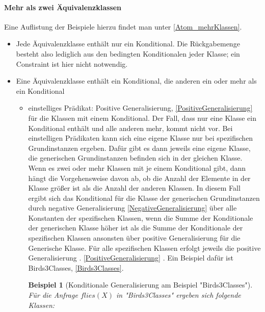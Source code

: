 \documentclass[a4paper, 11pt]{book}
\newtheorem{Bsp}{Beispiel}[section]
\begin{document}
\paragraph{ Mehr als zwei Äquivalenzklassen} 
Eine Auflistung der Beispiele hierzu findet man unter \ref{Atom_mehrKlassen}.\\
\begin{itemize}
	\item Jede Äquivalenzklasse enthält nur ein Konditional. Die Rückgabemenge besteht also lediglich aus den bedingten Konditionalen jeder Klasse; ein Constraint ist hier nicht notwendig.
	\item Eine Äquivalenzklasse enthält ein Konditional, die anderen ein oder mehr als ein Konditional
	\begin{itemize}
		\item einstelliges Prädikat: Positive Generalisierung, \ref{PositiveGeneralisierung} für die Klassen mit einem Konditional. Der Fall, dass nur eine Klasse ein Konditional enthält und alle anderen mehr, kommt nicht vor. Bei einstelligen Prädikaten kann sich eine eigene Klasse nur bei spezifischen Grundinstanzen ergeben. Dafür gibt es dann jeweils eine eigene Klasse, die generischen Grundinstanzen befinden sich in der gleichen Klasse. Wenn es zwei oder mehr Klassen mit je einem Konditional gibt, dann hängt die Vorgehensweise davon ab, ob die Anzahl der Elemente in der Klasse größer ist als die Anzahl der anderen Klassen. In diesem Fall ergibt sich das Konditional für die Klasse der generischen Grundinstanzen durch negative Generalisierung \ref{NegativeGeneralisierung}  über alle Konstanten der spezifischen Klassen, wenn die Summe der Konditionale der generischen Klasse höher ist als die Summe der Konditionale der spezifischen Klassen ansonsten über positive Generalisierung für die Generische Klasse. Für alle spezifischen Klassen erfolgt jeweils die positive Generalisierung . \ref{PositiveGeneralisierung} . Ein Beispiel dafür ist Birds3Classes, \ref{Birds3Classes}.\\
		\begin{Bsp}[Konditionale Generalisierung am Beispiel "{}Birds3Classes"{}]
		Für die Anfrage $ flies(X) $ in "{}Birds3Classes"{} ergeben sich folgende Klassen:\\
		

\end{Bsp}
\end{itemize}
\end{itemize}
\end{document}
